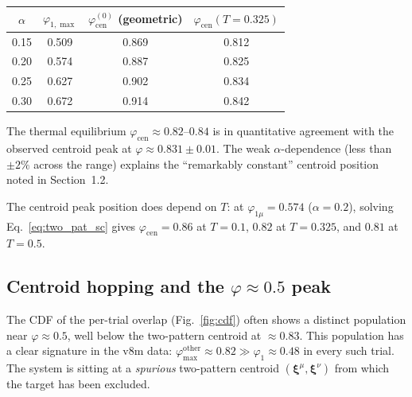 \documentclass[11pt]{article}
\newcommand{\bxi}{\boldsymbol{\xi}}
\begin{document}
\begin{center}
\begin{tabular}{cccc}
\toprule
$\alpha$ & $\varphi_{1,\max}$ & $\varphi_{\mathrm{cen}}^{(0)}$ (geometric) & $\varphi_{\mathrm{cen}}(T\!=\!0.325)$ \\
\midrule
0.15 & 0.509 & 0.869 & 0.812 \\
0.20 & 0.574 & 0.887 & 0.825 \\
0.25 & 0.627 & 0.902 & 0.834 \\
0.30 & 0.672 & 0.914 & 0.842 \\
\bottomrule
\end{tabular}
\end{center}

The thermal equilibrium $\varphi_{\mathrm{cen}} \approx 0.82$--$0.84$ is in quantitative agreement with the observed centroid peak at $\varphi \approx 0.831 \pm 0.01$.  The weak $\alpha$-dependence (less than $\pm 2\%$ across the range) explains the ``remarkably constant'' centroid position noted in Section~1.2.

The centroid peak position does depend on $T$: at $\varphi_{1\mu} = 0.574$ ($\alpha = 0.2$), solving Eq.~\eqref{eq:two_pat_sc} gives $\varphi_{\mathrm{cen}} = 0.86$ at $T = 0.1$, $0.82$ at $T = 0.325$, and $0.81$ at $T = 0.5$.

\subsection{Centroid hopping and the $\varphi \approx 0.5$ peak}
\label{sec:hopping}

The CDF of the per-trial overlap (Fig.~\ref{fig:cdf}) often shows a distinct population near $\varphi \approx 0.5$, well below the two-pattern centroid at $\approx 0.83$.  This population has a clear signature in the v8m data: $\varphi_{\max}^{\mathrm{other}} \approx 0.82 \gg \varphi_1 \approx 0.48$ in every such trial.  The system is sitting at a \emph{spurious} two-pattern centroid $(\bxi^\mu, \bxi^\nu)$ from which the target has been excluded.
\end{document}
